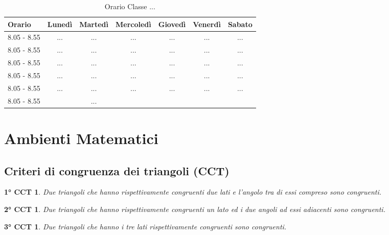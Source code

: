 \documentclass[a4paper,11pt]{article}
\begin{document}
    \begin{table}[h]
        \centering
        \begin{tabular}{|l|c|c|c|c|c|c|}
            \hline
            Orario &Lunedì & Martedì & Mercoledì & Giovedì & Venerdì & Sabato \\
            \hline
            \hline
            8.05 - 8.55 & ... & ... & ... & ... & ... & ... \\
            8.05 - 8.55 & ... & ... & ... & ... & ... & ... \\
            8.05 - 8.55 & ... & ... & ... & ... & ... & ... \\
            8.05 - 8.55 & ... & ... & ... & ... & ... & ... \\
            8.05 - 8.55 & ... & ... & ... & ... & ... & ... \\
            8.05 - 8.55 &     & ... &     &     &     &     \\
            \hline
        \end{tabular}
        \caption{Orario Classe ...}
        \label{tab:orario}
    \end{table}

    \section{Ambienti Matematici}
    \subsection*{Criteri di congruenza dei triangoli (CCT)}
    \newtheorem*{cct1}{1° CCT}
    \begin{cct1}
        Due triangoli che hanno rispettivamente congruenti due lati e l'angolo tra di essi compreso sono congruenti.
    \end{cct1}

    \newtheorem*{cct2}{2° CCT}
    \begin{cct2}
        Due triangoli che hanno rispettivamente congruenti un lato ed i due angoli ad essi adiacenti sono congruenti.
    \end{cct2}

    \newtheorem*{cct3}{3° CCT}
    \begin{cct3}
        Due triangoli che hanno i tre lati rispettivamente congruenti sono congruenti.
    \end{cct3}
\end{document}
